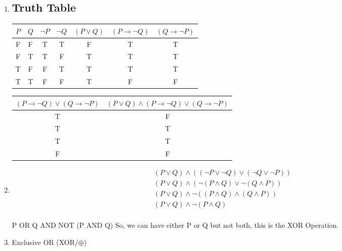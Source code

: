 \documentclass{article}
\begin{document}
\begin{enumerate}
    \item %
    \begin{samepage}
    \leavevmode

    \begin{center}
        \subsection*{Truth Table}
    \begin{tabular}{|c|c|c|c|c|c|c|}
    \hline
    $P$ & $Q$ & $\lnot P$ & $\lnot Q$ & $(P \lor Q)$ & $(P \to \lnot Q)$ & $(Q \to \lnot P)$ \\
    \hline
    F & F & T & T & F & T & T \\
    F & T & T & F & T & T & T \\
    T & F & F & T & T & T & T \\
    T & T & F & F & T & F & F \\

    \hline
    \end{tabular}

    \begin{tabular}{|c|c|}
    \hline
    $(P \to \lnot Q) \lor (Q \to \lnot P)$ & $(P \lor Q) \land (P \to \lnot Q) \lor (Q \to \lnot P)$ \\
    \hline
    T & F \\
    T & T \\
    T & T \\
    F & F \\

    \hline
    \end{tabular}
    \end{center}
    \end{samepage}
    
    \item %
    
    \begin{align*}
    (P \lor Q) \land ((\lnot P \lor \lnot Q) \lor (\lnot Q \lor \lnot P)) \\
    (P \lor Q) \land (\lnot ( P \land Q) \lor \lnot ( Q \land P)) \\
    (P \lor Q) \land \lnot (( P \land Q) \land ( Q \land P)) \\
    (P \lor Q) \land \lnot ( P \land Q) \\
    \end{align*}

    P OR Q AND NOT (P AND Q) \newline
    So, we can have either P or Q but not both, this is the XOR Operation.
    
    \item %
    
    Exclusive OR (XOR/$ \oplus $)

\end{enumerate}
\end{document}
